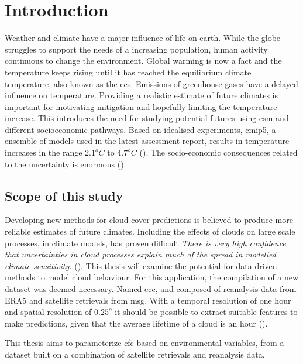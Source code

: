 \chapter{Introduction} \label{ch:introduction}
Weather and climate have a major influence of life on earth. While the globe struggles to support the needs of a increasing population, human activity continuous to change the environment. Global warming is now a fact and the temperature keeps rising until it has reached the equilibrium climate temperature, also known as the \acrfull{ecs}. Emissions of greenhouse gases have a delayed influence on temperature. Providing a realistic estimate of future climates is important for motivating mitigation and hopefully limiting the temperature increase. This introduces the need for studying potential futures using \acrfull{esm} and different socioeconomic pathways. Based on idealised experiments, \acrfull{cmip5}, a ensemble of models used in the latest assessment report, results in temperature increases in the range $2.1^oC$ to $4.7^oC$ (\cite{IPCC_CH9_climate_models}). The socio-economic consequences related to the uncertainty is enormous (\cite{bony2015}). 

\section{Scope of this study}
Developing new methods for cloud cover predictions is believed to produce more reliable estimates of future climates. %
Including the effects of clouds on large scale processes, in climate models, has proven difficult \textit{There is very high confidence that uncertainties in cloud processes explain much of the spread in modelled climate sensitivity.  } (\cite{IPCC_CH9_climate_models}). This thesis will examine the potential for data driven methods to model cloud behaviour. For this application, the compilation of a new dataset was deemed necessary. Named \acrfull{ecc}, and composed of reanalysis data from ERA5 and satellite retrievals from \acrfull{msg}. With a temporal resolution of one hour and spatial resolution of $0.25^o$ it should be possible to extract suitable features to make predictions, given that the average lifetime of a cloud is an hour  (\cite{lohmann2016}).

This thesis aims to parameterize \acrfull{cfc} based on environmental variables, from a dataset built on a combination of satellite retrievals and reanalysis data.

